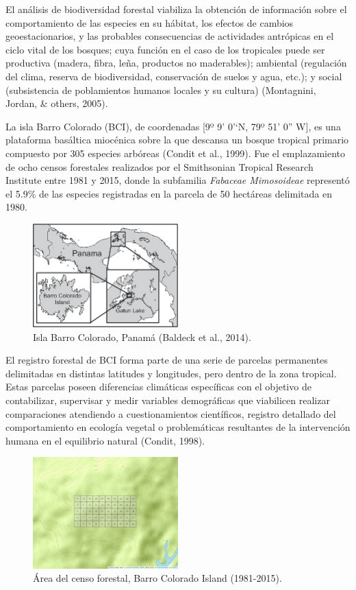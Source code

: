 \documentclass[11pt,]{article}
\begin{document}
El análisis de biodiversidad forestal viabiliza la obtención de
información sobre el comportamiento de las especies en su hábitat, los
efectos de cambios geoestacionarios, y las probables consecuencias de
actividades antrópicas en el ciclo vital de los bosques; cuya función en
el caso de los tropicales puede ser productiva (madera, fibra, leña,
productos no maderables); ambiental (regulación del clima, reserva de
biodiversidad, conservación de suelos y agua, etc.); y social
(subsistencia de poblamientos humanos locales y su cultura) (Montagnini,
Jordan, \& others, 2005).

La isla Barro Colorado (BCI), de coordenadas {[}9º 9' 0'`N, 79º 51' 0''
W{]}, es una plataforma basáltica miocénica sobre la que descansa un
bosque tropical primario compuesto por 305 especies arbóreas (Condit et
al., 1999). Fue el emplazamiento de ocho censos forestales realizados
por el Smithsonian Tropical Research Institute entre 1981 y 2015, donde
la subfamilia \emph{Fabaceae Mimosoideae} representó el 5.9\% de las
especies registradas en la parcela de 50 hectáreas delimitada en 1980.

\begin{figure}
\centering
\includegraphics[width=0.50000\textwidth]{Map-of-Barro-Colorado-Island-BCI-Panama.png}
\caption{Isla Barro Colorado, Panamá (Baldeck et al., 2014).}
\end{figure}

El registro forestal de BCI forma parte de una serie de parcelas
permanentes delimitadas en distintas latitudes y longitudes, pero dentro
de la zona tropical. Estas parcelas poseen diferencias climáticas
específicas con el objetivo de contabilizar, supervisar y medir
variables demográficas que viabilicen realizar comparaciones atendiendo
a cuestionamientos científicos, registro detallado del comportamiento en
ecología vegetal o problemáticas resultantes de la intervención humana
en el equilibrio natural (Condit, 1998).

\begin{figure}
\centering
\includegraphics[width=0.50000\textwidth]{mapa_cuadros.png}
\caption{Área del censo forestal, Barro Colorado Island (1981-2015).}
\end{figure}
\end{document}
